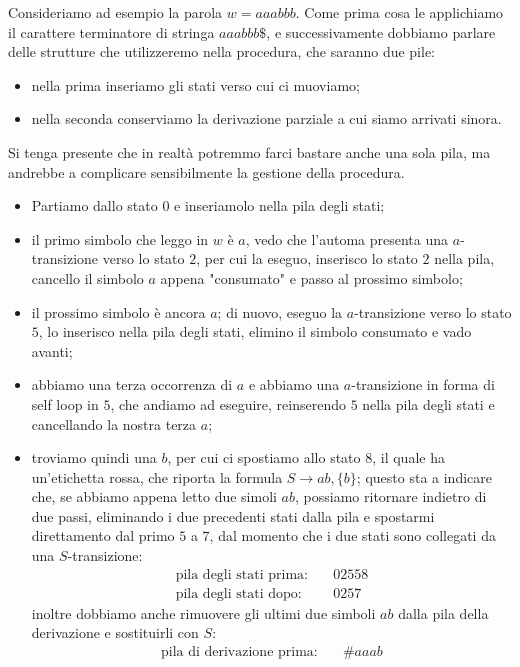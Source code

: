 \documentclass[class=book, crop=false, oneside, 12pt]{standalone}
\begin{document}
Consideriamo ad esempio la parola \(w = aaabbb\). Come prima cosa le applichiamo il carattere terminatore di stringa \(aaabbb\$\), e successivamente dobbiamo parlare delle strutture che utilizzeremo nella procedura, che saranno due pile:
\begin{itemize}
    \item nella prima inseriamo gli stati verso cui ci muoviamo;
    \item nella seconda conserviamo la derivazione parziale a cui siamo arrivati sinora.
\end{itemize}
Si tenga presente che in realtà potremmo farci bastare anche una sola pila, ma andrebbe a complicare sensibilmente la gestione della procedura.
\begin{itemize}
    \item Partiamo dallo stato \(0\) e inseriamolo nella pila degli stati;
    \item il primo simbolo che leggo in \(w\) è \(a\), vedo che l'automa presenta una \(a\)-transizione verso lo stato \(2\), per cui la eseguo, inserisco lo stato \(2\) nella pila, cancello il simbolo \(a\) appena "consumato" e passo al prossimo simbolo;
    \item il prossimo simbolo è ancora \(a\); di nuovo, eseguo la \(a\)-transizione verso lo stato \(5\), lo inserisco nella pila degli stati, elimino il simbolo consumato e vado avanti;
    \item abbiamo una terza occorrenza di \(a\) e abbiamo una \(a\)-transizione in forma di self loop in \(5\), che andiamo ad eseguire, reinserendo \(5\) nella pila degli stati e cancellando la nostra terza \(a\);
    \item troviamo quindi una \(b\), per cui ci spostiamo allo stato \(8\), il quale ha un'etichetta rossa, che riporta la formula \(S \to ab, \{b\}\); questo sta a indicare che, se abbiamo appena letto due simoli \(ab\), possiamo ritornare indietro di due passi, eliminando i due precedenti stati dalla pila e spostarmi direttamento dal primo \(5\) a \(7\), dal momento che i due stati sono collegati da una \(S\)-transizione:
    \begin{align*}
        \textrm{pila degli stati prima:} &\quad 02558 \\
        \textrm{pila degli stati dopo:} &\quad 0257 
    \end{align*}
    inoltre dobbiamo anche rimuovere gli ultimi due simboli \(ab\) dalla pila della derivazione e sostituirli con \(S\):
    \begin{align*}
        \textrm{pila di derivazione prima:} &\quad \#aaab \\

\end{align*}
\end{itemize}
\end{document}

